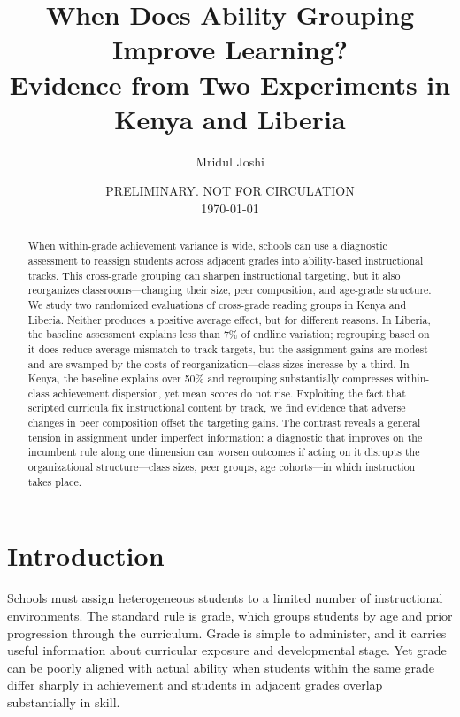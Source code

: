 \documentclass[11pt]{article}
\title{When Does Ability Grouping Improve Learning? \\ Evidence from Two Experiments in Kenya and Liberia}
\author{Mridul Joshi}
\begin{document}
\begin{titlepage}


\date{PRELIMINARY. NOT FOR CIRCULATION \\ \today}
\maketitle

\begin{abstract}\noindent
When within-grade achievement variance is wide, schools can use a diagnostic assessment to reassign students across adjacent grades into ability-based instructional tracks. This cross-grade grouping can sharpen instructional targeting, but it also reorganizes classrooms---changing their size, peer composition, and age-grade structure. We study two randomized evaluations of cross-grade reading groups in Kenya and Liberia. Neither produces a positive average effect, but for different reasons. In Liberia, the baseline assessment explains less than 7\% of endline variation; regrouping based on it does reduce average mismatch to track targets, but the assignment gains are modest and are swamped by the costs of reorganization---class sizes increase by a third. In Kenya, the baseline explains over 50\% and regrouping substantially compresses within-class achievement dispersion, yet mean scores do not rise. Exploiting the fact that scripted curricula fix instructional content by track, we find evidence that adverse changes in peer composition offset the targeting gains. The contrast reveals a general tension in assignment under imperfect information: a diagnostic that improves on the incumbent rule along one dimension can worsen outcomes if acting on it disrupts the organizational structure---class sizes, peer groups, age cohorts---in which instruction takes place.

\end{abstract}
\setcounter{page}{0}
\thispagestyle{empty}
\end{titlepage}
\doublespacing

\section{Introduction}
\label{sec:intro}

Schools must assign heterogeneous students to a limited number of instructional environments. The standard rule is grade, which groups students by age and prior progression through the curriculum. Grade is simple to administer, and it carries useful information about curricular exposure and developmental stage. Yet grade can be poorly aligned with actual ability when students within the same grade differ sharply in achievement and students in adjacent grades overlap substantially in skill.
\end{document}

